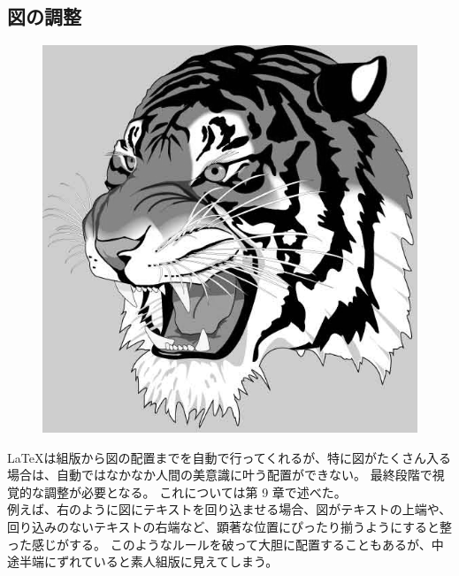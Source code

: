 \subsection{図の調整}
\begin{figure}
  \vspace*{-\intextsep}
  \includegraphics[width=6zw]{./Fig/Fig09_01.PNG}
\end{figure}
\LaTeX{}は組版から図の配置までを自動で行ってくれるが、特に図がたくさん入る場合は、自動ではなかなか人間の美意識に叶う配置ができない。
最終段階で視覚的な調整が必要となる。
これについては第 9 章で述べた。\\

例えば、右のように図にテキストを回り込ませる場合、図がテキストの上端や、回り込みのないテキストの右端など、顕著な位置にぴったり揃うようにすると整った感じがする。
このようなルールを破って大胆に配置することもあるが、中途半端にずれていると素人組版に見えてしまう。
